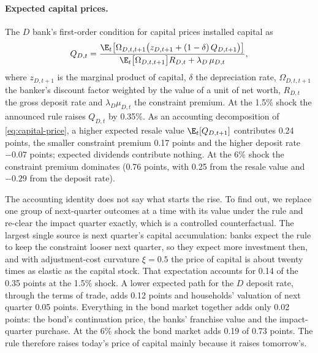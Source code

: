 \paragraph{Expected capital prices.}
The $D$ bank's first-order condition for capital prices installed capital as
\begin{equation}
Q_{D,t}=\frac{\E_t\bigl[\Omega_{D,t,t+1}\bigl(z_{D,t+1}+(1-\delta)\,Q_{D,t+1}\bigr)\bigr]}
{\E_t\bigl[\Omega_{D,t,t+1}\bigr]R_{D,t}+\lambda_D\,\mu_{D,t}},
\label{eq:capital-price}
\end{equation}
where $z_{D,t+1}$ is the marginal product of capital, $\delta$ the depreciation rate,
$\Omega_{D,t,t+1}$ the banker's discount factor weighted by the value of a unit of net worth,
$R_{D,t}$ the gross deposit rate and $\lambda_D\mu_{D,t}$ the constraint premium. At the
1.5\% shock the announced rule raises $Q_{D,t}$ by 0.35\%. As an accounting decomposition of
\cref{eq:capital-price}, a higher expected resale value $\E_t[Q_{D,t+1}]$ contributes 0.24
points, the smaller constraint premium 0.17 points and the higher deposit rate $-0.07$ points;
expected dividends contribute nothing. At the 6\% shock the constraint premium dominates
(0.76 points, with 0.25 from the resale value and $-0.29$ from the deposit rate).

The accounting identity does not say what starts the rise. To find out, we replace one group
of next-quarter outcomes at a time with its value under the rule and re-clear the impact
quarter exactly, which is a controlled counterfactual. The largest single source is next
quarter's capital accumulation: banks expect the rule to keep the constraint looser
next quarter, so they expect more investment then, and with adjustment-cost curvature
$\xi=0.5$ the price of capital is about twenty times as elastic as the capital stock. That
expectation accounts for 0.14 of the 0.35 points at the 1.5\% shock. A lower expected path
for the $D$ deposit rate, through the terms of trade, adds 0.12 points and households'
valuation of next quarter 0.05 points. Everything in the bond market together adds only 0.02
points: the bond's continuation price, the banks' franchise value and the impact-quarter
purchase. At the 6\% shock the bond market adds 0.19 of 0.73 points. The rule therefore
raises today's price of capital mainly because it raises tomorrow's.

